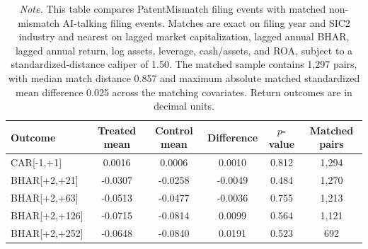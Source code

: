 \begin{table}[p]
\centering
\small
\caption{Matched AI-talking comparison sample}
\label{tab:appendix_matched_ai_talking}
\begin{tabular}{lccccc}
\hline
Outcome & Treated mean & Control mean & Difference & $p$-value & Matched pairs \\
\hline
CAR[-1,+1] & 0.0016 & 0.0006 & 0.0010 & 0.812 & 1,294 \\
BHAR[+2,+21] & -0.0307 & -0.0258 & -0.0049 & 0.484 & 1,270 \\
BHAR[+2,+63] & -0.0513 & -0.0477 & -0.0036 & 0.755 & 1,213 \\
BHAR[+2,+126] & -0.0715 & -0.0814 & 0.0099 & 0.564 & 1,121 \\
BHAR[+2,+252] & -0.0648 & -0.0840 & 0.0191 & 0.523 & 692 \\
\hline
\end{tabular}
\caption*{\footnotesize \textit{Note.} This table compares PatentMismatch filing events with matched non-mismatch AI-talking filing events. Matches are exact on filing year and SIC2 industry and nearest on lagged market capitalization, lagged annual BHAR, lagged annual return, log assets, leverage, cash/assets, and ROA, subject to a standardized-distance caliper of 1.50. The matched sample contains 1,297 pairs, with median match distance 0.857 and maximum absolute matched standardized mean difference 0.025 across the matching covariates. Return outcomes are in decimal units.}
\end{table}
